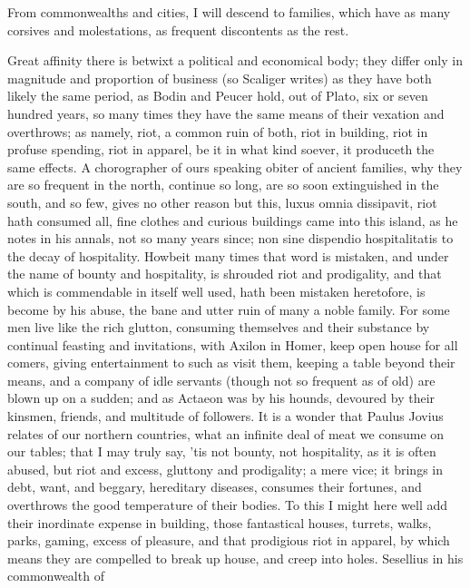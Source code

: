 {From commonwealths and cities, I will descend to families, which have
as many corsives and molestations, as frequent discontents as the rest.

Great affinity there is betwixt a political and economical body; they
differ only in magnitude and proportion of business (so Scaliger
writes) as they have both likely the same period, as Bodin
and Peucer hold, out of Plato, six or seven hundred years, so many
times they have the same means of their vexation and overthrows; as
namely, riot, a common ruin of both, riot in building, riot in profuse
spending, riot in apparel, \etc{} be it in what kind soever, it produceth
the same effects. A chorographer of ours speaking obiter of
ancient families, why they are so frequent in the north, continue so
long, are so soon extinguished in the south, and so few, gives no other
reason but this, luxus omnia dissipavit, riot hath consumed all, fine
clothes and curious buildings came into this island, as he notes in his
annals, not so many years since; non sine dispendio hospitalitatis to
the decay of hospitality. Howbeit many times that word is mistaken, and
under the name of bounty and hospitality, is shrouded riot and
prodigality, and that which is commendable in itself well used, hath
been mistaken heretofore, is become by his abuse, the bane and utter
ruin of many a noble family. For some men live like the rich glutton,
consuming themselves and their substance by continual feasting and
invitations, with Axilon in Homer, keep open house for all comers,
giving entertainment to such as visit them, keeping a table beyond
their means, and a company of idle servants (though not so frequent as
of old) are blown up on a sudden; and as Actaeon was by his hounds,
devoured by their kinsmen, friends, and multitude of followers. It
is a wonder that Paulus Jovius relates of our northern countries, what
an infinite deal of meat we consume on our tables; that I may truly
say, 'tis not bounty, not hospitality, as it is often abused, but riot
and excess, gluttony and prodigality; a mere vice; it brings in debt,
want, and beggary, hereditary diseases, consumes their fortunes, and
overthrows the good temperature of their bodies. To this I might here
well add their inordinate expense in building, those fantastical
houses, turrets, walks, parks, \etc{} gaming, excess of pleasure, and that
prodigious riot in apparel, by which means they are compelled to break
up house, and creep into holes. Sesellius in his commonwealth of
}

